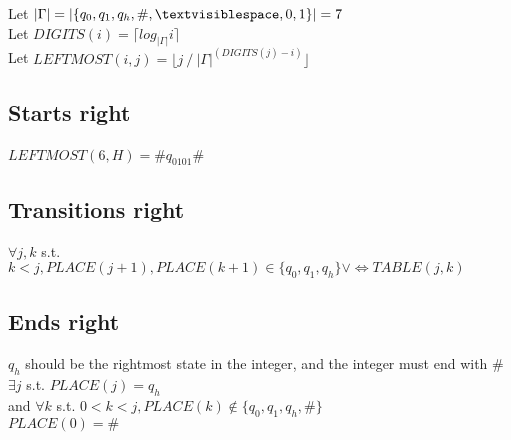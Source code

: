 \documentclass[letterpaper,notitlepage,twoside]{article}
\renewcommand{\iff}{\Leftrightarrow} %
\begin{document}
Let $|\Gamma| = |\{q_0, q_1, q_h, \#, \textvisiblespace, 0, 1\}| = 7$ \\

Let $DIGITS(i) = \lceil log_{|\Gamma|}i \rceil$ \\ 
Let $LEFTMOST(i, j) = \lfloor j \mathbin{/} |\Gamma|^{(DIGITS(j) - i)} \rfloor$ \\

\subsection*{Starts right}
$LEFTMOST(6, H) = \#q_0101$\#

\subsection*{Transitions right}
$\forall j, k$ s.t. $k < j, PLACE(j+1), PLACE(k+1) \in \{q_0, q_1, q_h\} \lor  \iff TABLE(j, k)$

\subsection*{Ends right}
$q_h$ should be the rightmost state in the integer, and the integer must end with $\#$ \\
$\exists j$ s.t. $PLACE(j) = q_h$ \\
and $\forall k$ s.t. $0 < k < j, PLACE(k) \notin \{q_0, q_1, q_h, \# \}$ \\

$PLACE(0) = \#$
\end{document}
